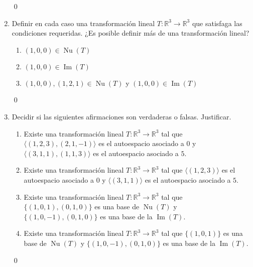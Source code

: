 \begin{enumerate}[topsep=6pt, itemsep=.4cm]
\rta


\qed


        
\item Definir en cada caso una transformación lineal $T:\mathbb{R}^3\longrightarrow\mathbb{R}^3$ que satisfaga las condiciones requeridas. ¿Es posible definir más de una transformación lineal?
\begin{enumerate}
    \item\label{tl-condiciones-a} $(1,0,0)\in \operatorname{Nu}(T)$ 
    \item\label{tl-condiciones-b} $(1,0,0)\in \operatorname{Im}(T)$ 
    \item\label{tl-condiciones-c} $(1,0,0),(1,2,1)\in\operatorname{Nu}(T)$ y $(1,0,0) \in  \operatorname{Im}(T)$
\end{enumerate}

\rta


\qed



\item Decidir si las siguientes afirmaciones son verdaderas o falsas. Justificar. 
\begin{enumerate}
    \item\label{tl-V-o-F-a} Existe una transformación lineal $T:\mathbb{R}^3\longrightarrow\mathbb{R}^3$ tal que $\langle(1,2,3),(2,1,-1)\rangle$ es el autoespacio asociado a $0$ y $\langle(3,1,1),(1,1,3)\rangle$ es el autoespacio asociado a $5$.
    \item\label{tl-V-o-F-b} Existe una transformación lineal $T:\mathbb{R}^3\longrightarrow\mathbb{R}^3$ tal que $\langle(1,2,3)\rangle$ es el autoespacio asociado a $0$ y $\langle(3,1,1)\rangle$ es el autoespacio asociado a $5$.
    \item\label{tl-V-o-F-c} Existe una transformación lineal $T:\mathbb{R}^3\longrightarrow\mathbb{R}^3$ tal que $\{(1,0,1), (0,1,0)\}$ es una base de $\operatorname{Nu}(T)$ y  $\{(1,0,-1), (0,1,0)\}$ es una base de la $\operatorname{Im}(T)$.
    \item\label{tl-V-o-F-d} Existe una transformación lineal $T:\mathbb{R}^3\longrightarrow\mathbb{R}^3$ tal que $\{(1,0,1)\}$ es una base de $\operatorname{Nu}(T)$ y  $\{(1,0,-1), (0,1,0)\}$ es una base de la $\operatorname{Im}(T)$. 
\end{enumerate}

\rta


\qed


\end{enumerate}


